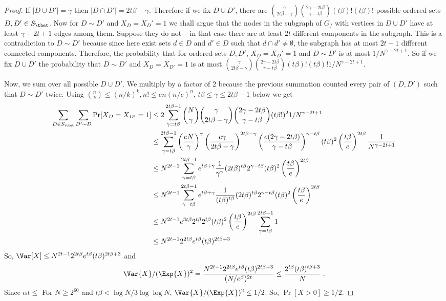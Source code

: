 \begin{proof}
If $|D\cup D'|=\gamma$ then $|D\cap D'|=2t\beta-\gamma$. Therefore if we fix $D\cup D'$, there are $\binom{\gamma}{2t\beta-\gamma}\binom{2\gamma-2t\beta}{\gamma-t\beta}(t\beta)!(t\beta)!$ possible ordered sets $D,D'\in S_\tbet$. Now for $D\sim D'$ and $X_D=X_D'=1$ we shall argue that the nodes in the subgraph of $G_f$ with vertices in $D\cup D'$ have at least $\gamma-2t+1$ edges among them. Suppose they do not -- in that case there are at least $2t$ different components in the subgraph. This is a contradiction to $D\sim D'$ because since here exist sets $d\in D$ and $d'\in D$ such that $d\cap d'\neq \emptyset$, the subgraph has at most $2t-1$ different connected components. Therefore, the probability that for ordered sets $D,D'$, $X_D=X_D'=1$ and $D\sim D'$ is at most $1/N^{\gamma-2t+1}$. So if we fix $D\cup D'$ the probability that $D\sim D'$ and $X_D=X_{D'}=1$ is at most $\binom{\gamma}{2t\beta-\gamma}\binom{2\gamma-2t\beta}{\gamma-t\beta}(t\beta)!(t\beta)!1/N^{\gamma-2t+1}$.

Now, we sum over all possible $D\cup D'$. We multiply by a factor of $2$ because the previous summation counted every pair of $(D,D')$ such that $D\sim D'$ twice. Using $\binom{n}{k}\leq (n/k)^k,n!\leq en(n/e)^n$, $t\beta\leq \gamma\leq 2t\beta-1$ below we get
\begin{align*}
\sum_{D\in S_\tbet}\sum_{D'\sim D} \Pr[X_D=X_{D'}=1]&\leq 2\sum_{\gamma=t\beta}^{2t\beta-1}\binom{N}{\gamma}\binom{\gamma}{2t\beta-\gamma}\binom{2\gamma-2t\beta}{\gamma-t\beta}(t\beta!)^2 1/N^{\gamma-2t+1} \\
&\leq \sum_{\gamma=t\beta}^{2t\beta-1} \left(\frac{eN}{\gamma}\right)^\gamma \left(\frac{e\gamma}{2t\beta-\gamma}\right)^{2t\beta-\gamma}\left(\frac{e(2\gamma-2t\beta)}{\gamma-t\beta}\right)^{\gamma-t\beta}(t\beta)^2\left(\frac{t\beta}{e}\right)^{2t\beta}\frac{1}{N^{\gamma-2t+1}} \\
&\leq N^{2t-1}\sum_{\gamma=t\beta}^{2t\beta-1}e^{t\beta+\gamma}\frac{1}{\gamma^\gamma}(2t\beta)^{t\beta}2^{\gamma-t\beta}(t\beta)^2\left(\frac{t\beta}{e}\right)^{2t\beta}\\
&\leq N^{2t-1}\sum_{\gamma=t\beta}^{2t\beta-1}e^{t\beta+\gamma}\frac{1}{(t\beta)^{t\beta}}(2t\beta)^{t\beta}2^{\gamma-t\beta}(t\beta)^2\left(\frac{t\beta}{e}\right)^{2t\beta}\\
&\leq N^{2t-1}e^{3t\beta}2^{t\beta}2^{t\beta} (t\beta)^2\left(\frac{t\beta}{e}\right)^{2t\beta}\sum_{\gamma=t\beta}^{2t\beta-1} 1\\
& \leq N^{2t-1}2^{2t\beta}e^{t\beta}(t\beta)^{2t\beta+3}
\end{align*}
So, $\Var[X]\leq N^{2t-1}2^{2t\beta}e^{t\beta}(t\beta)^{2t\beta+3}$ and 
 \[\Var{X}/(\Exp{X})^2=\frac{N^{2t-1}2^{2t\beta}e^{t\beta}(t\beta)^{2t\beta+3}}{(N/e^\beta)^{2t}}\leq \frac{2^{t\beta}(t\beta)^{t\beta+3}}{N}\;.\]
 Since $\alpha t\leq $
For $N\geq 2^{60}$ and $t\beta<\log N/3\log \log N$, $\Var{X}/(\Exp{X})^2 \leq 1/2$.
So, $\Pr[X>0]\geq 1/2$.


\end{proof}
